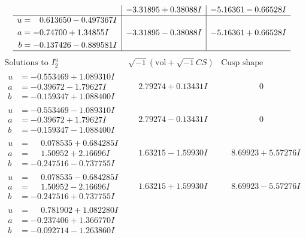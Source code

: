\documentclass[1p]{elsarticle_modified}
\theoremstyle{definition}
\newcommand{\I}{\sqrt{-1}}
\begin{document}
$$\begin{array}{c|c|c}
 & -3.31895 + 0.38088 I & -5.16361 - 0.66528 I \\ \hline\begin{aligned}
u &= \phantom{-}0.613650 - 0.497367 I \\
a &= -0.74700 + 1.34855 I \\
b &= -0.137426 - 0.889581 I\end{aligned}
 & -3.31895 - 0.38088 I & -5.16361 + 0.66528 I\\
 \hline 
 \end{array}$$\newpage$$\begin{array}{c|c|c}  
\text{Solutions to }I^u_{2}& \I (\text{vol} + \sqrt{-1}CS) & \text{Cusp shape}\\
 \hline 
\begin{aligned}
u &= -0.553469 + 1.089310 I \\
a &= -0.39672 - 1.79627 I \\
b &= -0.159347 + 1.088400 I\end{aligned}
 & \phantom{-}2.79274 + 0.13431 I & \phantom{-0.000000 } 0 \\ \hline\begin{aligned}
u &= -0.553469 - 1.089310 I \\
a &= -0.39672 + 1.79627 I \\
b &= -0.159347 - 1.088400 I\end{aligned}
 & \phantom{-}2.79274 - 0.13431 I & \phantom{-0.000000 } 0 \\ \hline\begin{aligned}
u &= \phantom{-}0.078535 + 0.684285 I \\
a &= \phantom{-}1.50952 + 2.16696 I \\
b &= -0.247516 - 0.737755 I\end{aligned}
 & \phantom{-}1.63215 - 1.59930 I & \phantom{-}8.69923 + 5.57276 I \\ \hline\begin{aligned}
u &= \phantom{-}0.078535 - 0.684285 I \\
a &= \phantom{-}1.50952 - 2.16696 I \\
b &= -0.247516 + 0.737755 I\end{aligned}
 & \phantom{-}1.63215 + 1.59930 I & \phantom{-}8.69923 - 5.57276 I \\ \hline\begin{aligned}
u &= \phantom{-}0.781902 + 1.082280 I \\
a &= -0.237406 + 1.366770 I \\
b &= -0.092714 - 1.263860 I\end{aligned}

\end{array}$$
\end{document}
